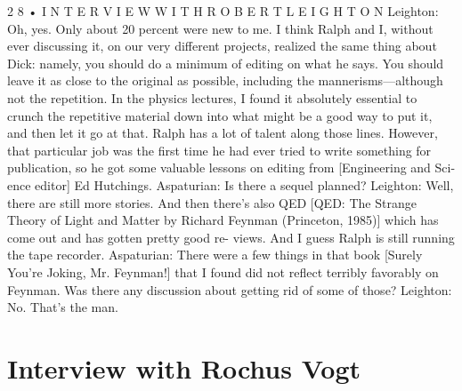 \documentclass[11pt,oneside]{article}
\begin{document}
2 8 • I N T E R V I E W  W I T H  R O B E R T  L E I G H T O N Leighton: Oh, yes. Only about 20 percent were new to me. I think Ralph and I, without ever discussing it, on our very different projects, realized the same thing about Dick: namely, you should do a minimum of editing on what he says. You should leave it as close to the original as possible, including the mannerisms---although not the repetition. In the physics lectures, I found it absolutely essential to crunch the repetitive material down into what might be a good way to put it, and then let it go at that. Ralph has a lot of talent along those lines. However, that particular job was the first time he had ever tried to write something for publication, so he got some valuable lessons on editing from [Engineering and Sci- ence editor] Ed Hutchings. Aspaturian: Is there a sequel planned? Leighton: Well, there are still more stories. And then there’s also QED [QED: The Strange Theory of Light and Matter by Richard Feynman (Princeton, 1985)] which has come out and has gotten pretty good re- views. And I guess Ralph is still running the tape recorder. Aspaturian: There were a few things in that book [Surely You’re Joking, Mr. Feynman!] that I found did not reflect terribly favorably on Feynman. Was there any discussion about getting rid of some of those? Leighton: No. That’s the man.\par



\clearpage


\section*{Interview with Rochus Vogt}



\label{tips-sec-8-interview-with-rochus-vogt}

\end{document}
